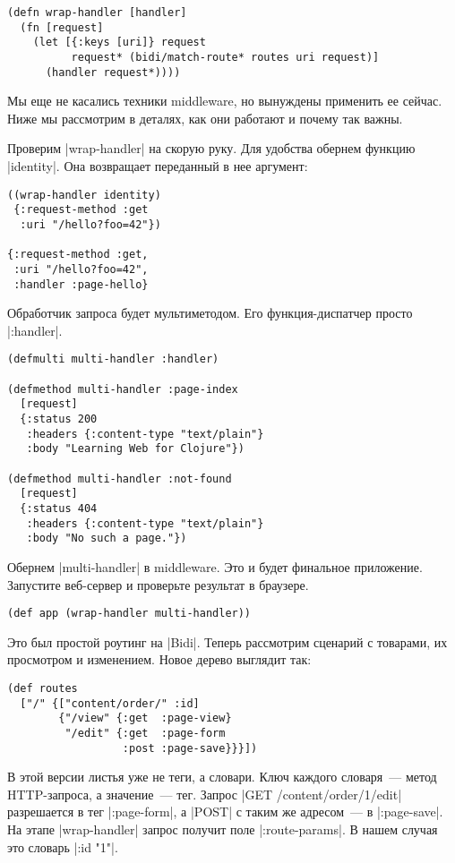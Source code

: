 \begin{verbatim}
(defn wrap-handler [handler]
  (fn [request]
    (let [{:keys [uri]} request
          request* (bidi/match-route* routes uri request)]
      (handler request*))))
\end{verbatim}

Мы еще не касались техники middleware, но вынуждены применить ее сейчас. Ниже мы
рассмотрим в деталях, как они работают и почему так важны.

Проверим \spverb|wrap-handler| на скорую руку. Для удобства обернем функцию
\spverb|identity|. Она возвращает переданный в нее аргумент:

\begin{verbatim}
((wrap-handler identity)
 {:request-method :get
  :uri "/hello?foo=42"})

{:request-method :get,
 :uri "/hello?foo=42",
 :handler :page-hello}
\end{verbatim}

Обработчик запроса будет мультиметодом. Его функция-диспатчер просто
\spverb|:handler|.

\begin{verbatim}
(defmulti multi-handler :handler)

(defmethod multi-handler :page-index
  [request]
  {:status 200
   :headers {:content-type "text/plain"}
   :body "Learning Web for Clojure"})

(defmethod multi-handler :not-found
  [request]
  {:status 404
   :headers {:content-type "text/plain"}
   :body "No such a page."})
\end{verbatim}

Обернем \spverb|multi-handler| в middleware. Это и будет финальное
приложение. Запустите веб-сервер и проверьте результат в браузере.

\begin{verbatim}
(def app (wrap-handler multi-handler))
\end{verbatim}

Это был простой роутинг на \spverb|Bidi|. Теперь рассмотрим сценарий с товарами,
их просмотром и изменением. Новое дерево выглядит так:

\begin{verbatim}
(def routes
  ["/" {["content/order/" :id]
        {"/view" {:get  :page-view}
         "/edit" {:get  :page-form
                  :post :page-save}}}])
\end{verbatim}

В этой версии листья уже не теги, а словари. Ключ каждого словаря~--- метод
HTTP-запроса, а значение~--- тег. Запрос \spverb|GET /content/order/1/edit|
разрешается в тег \spverb|:page-form|, а \spverb|POST| с таким же адресом~--- в \spverb|:page-save|.
На этапе \spverb|wrap-handler| запрос получит поле \spverb|:route-params|.
В нашем случая это словарь \spverb|{:id "1"}|.

